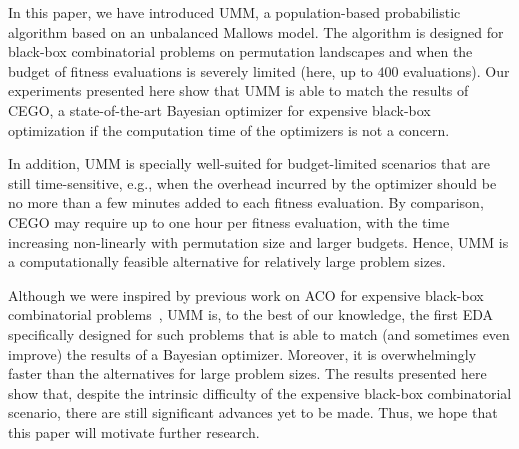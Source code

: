 \documentclass[sigconf,dvipsnames]{acmart}
\begin{document}
In this paper, we have introduced UMM, a population-based probabilistic
algorithm based on an unbalanced Mallows model. The algorithm is designed for
black-box combinatorial problems on permutation landscapes and when the budget
of fitness evaluations is severely limited (here, up to $400$ evaluations).
Our experiments presented here show that UMM is able to match the results of
CEGO, a state-of-the-art Bayesian optimizer for expensive black-box
optimization if the computation time of the optimizers is not a concern.

In addition, UMM is specially well-suited for budget-limited scenarios that are
still time-sensitive, e.g., when the overhead incurred by the optimizer should
be no more than a few minutes added to each fitness evaluation. By comparison,
CEGO may require up to one hour per fitness evaluation, with the time
increasing non-linearly with permutation size and larger budgets.  Hence, UMM
is a computationally feasible alternative for relatively large problem sizes.



Although we were inspired by previous work on ACO for expensive black-box
combinatorial problems~\citep{PerLopStu2015si}, UMM is, to the best of our
knowledge, the first EDA specifically designed for such problems that is able
to match (and sometimes even improve) the results of a Bayesian
optimizer. Moreover, it is overwhelmingly faster than the alternatives for
large problem sizes.  The results presented here show that, despite the
intrinsic difficulty of the expensive black-box combinatorial scenario, there
are still significant advances yet to be made. Thus, we hope that this paper
will motivate further research. %
\end{document}
